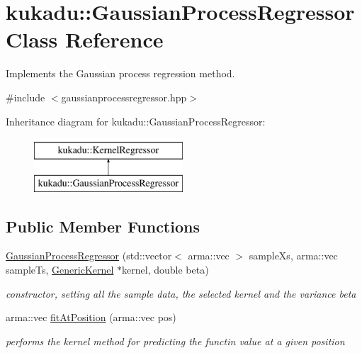 \hypertarget{classkukadu_1_1GaussianProcessRegressor}{\section{kukadu\-:\-:Gaussian\-Process\-Regressor Class Reference}
\label{classkukadu_1_1GaussianProcessRegressor}
}


Implements the Gaussian process regression method.  




{\ttfamily \#include $<$gaussianprocessregressor.\-hpp$>$}

Inheritance diagram for kukadu\-:\-:Gaussian\-Process\-Regressor\-:\begin{figure}[H]
\begin{center}
\leavevmode
\includegraphics[height=2.000000cm]{classkukadu_1_1GaussianProcessRegressor}
\end{center}
\end{figure}
\subsection*{Public Member Functions}
\begin{DoxyCompactItemize}
\item 
\hyperlink{classkukadu_1_1GaussianProcessRegressor_a59721469c936e4352a28301ed3d8acc3}{Gaussian\-Process\-Regressor} (std\-::vector$<$ arma\-::vec $>$ sample\-Xs, arma\-::vec sample\-Ts, \hyperlink{classkukadu_1_1GenericKernel}{Generic\-Kernel} $\ast$kernel, double beta)
\begin{DoxyCompactList}\small\item\em constructor, setting all the sample data, the selected kernel and the variance beta \end{DoxyCompactList}\item 
arma\-::vec \hyperlink{classkukadu_1_1GaussianProcessRegressor_a397a1d055761ae22ec9edc3d311949ec}{fit\-At\-Position} (arma\-::vec pos)
\begin{DoxyCompactList}\small\item\em performs the kernel method for predicting the functin value at a given position \end{DoxyCompactList}\end{DoxyCompactItemize}


